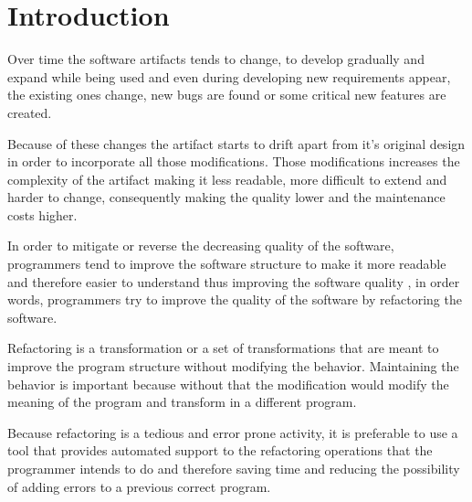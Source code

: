 
% 
% 

\section{Introduction}

Over time the software artifacts tends to change, to develop gradually and expand %
 while being used and even during developing new requirements appear, the existing ones change, new bugs are found or some critical %
  new features are created.

Because of these changes the artifact starts to drift apart from it's original design in order to incorporate all those modifications.
Those modifications increases the complexity of the artifact making it less readable, more difficult to extend and harder to change, consequently making the quality lower and the maintenance costs higher. %


In order to mitigate or reverse the decreasing quality of the software, programmers tend to improve the software structure to make it more readable and therefore easier to understand thus improving the software quality \cite{bourquin2007high}, in order words, programmers try to improve the quality of the software by refactoring the software. %

Refactoring is a transformation or a set of transformations that are meant to improve the program structure without modifying the behavior. Maintaining the behavior is important because without that the modification would modify the meaning of the program and transform in a different program.


Because refactoring is a tedious and error prone activity, it is preferable to use a tool that provides automated support to the refactoring operations that the programmer intends to do and therefore saving time and reducing the possibility of adding errors to a previous correct program.



